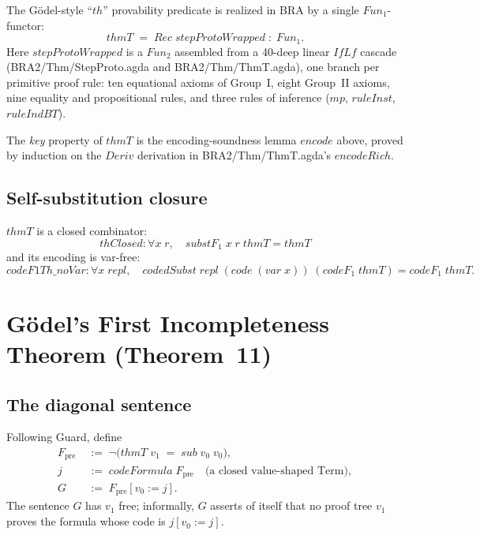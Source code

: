 \documentclass[11pt]{article}
\begin{document}
The G\"odel-style ``$\mathit{th}$'' provability predicate is realized
in BRA by a single $\mathit{Fun}_1$-functor:
\[
  \mathit{thmT} \;=\; \mathit{Rec}\;\mathit{stepProtoWrapped} \;:\; \mathit{Fun}_1.
\]
Here $\mathit{stepProtoWrapped}$ is a $\mathit{Fun}_2$ assembled from a
40-deep linear $\mathit{IfLf}$ cascade (BRA2/Thm/StepProto.agda and
BRA2/Thm/ThmT.agda), one branch per primitive proof rule: ten
equational axioms of Group~I, eight Group~II axioms, nine
equality and propositional rules, and three rules of inference
($\mathit{mp}$, $\mathit{ruleInst}$, $\mathit{ruleIndBT}$).

The \emph{key} property of $\mathit{thmT}$ is the encoding-soundness
lemma $\mathit{encode}$ above, proved by induction on the
$\mathit{Deriv}$ derivation in BRA2/Thm/ThmT.agda's $\mathit{encodeRich}$.

\subsection{Self-substitution closure}

$\mathit{thmT}$ is a closed combinator:
\[
  \mathit{thClosed} : \forall x\;r,\quad \mathit{substF}_1\;x\;r\;\mathit{thmT} = \mathit{thmT}
\]
and its encoding is var-free:
\[
  \mathit{codeF1Th\_noVar} : \forall x\;\mathit{repl},\quad
    \mathit{codedSubst}\;\mathit{repl}\;(\mathit{code}\;(\mathit{var}\;x))\;(\mathit{codeF}_1\;\mathit{thmT})
    = \mathit{codeF}_1\;\mathit{thmT}.
\]

\section{G\"odel's First Incompleteness Theorem (Theorem~11)}

\subsection{The diagonal sentence}

Following Guard, define
\begin{align*}
  F_{\mathrm{pre}} \;&:=\; \neg \big(\mathit{thmT}\;v_1 \;=\; \mathit{sub}\;v_0\;v_0\big),\\
  j \;&:=\; \mathit{codeFormula}\;F_{\mathrm{pre}} \quad \text{(a closed value-shaped Term)},\\
  G \;&:=\; F_{\mathrm{pre}}[v_0 := j].
\end{align*}
The sentence $G$ has $v_1$ free; informally, $G$ asserts of itself
that no proof tree $v_1$ proves the formula whose code is
$j[v_0 := j]$.
\end{document}
